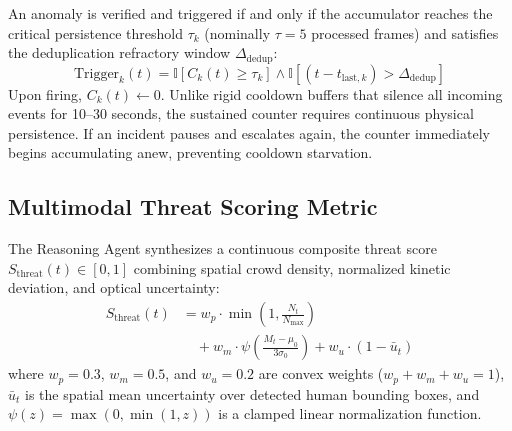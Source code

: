 \documentclass[conference]{IEEEtran}
\begin{document}
An anomaly is verified and triggered if and only if the accumulator reaches the critical persistence threshold $\tau_k$ (nominally $\tau = 5$ processed frames) and satisfies the deduplication refractory window $\Delta_{\text{dedup}}$:
\begin{equation}
\text{Trigger}_k(t) = \mathbb{I}\left[ C_k(t) \ge \tau_k \right] \land \mathbb{I}\left[ (t - t_{\text{last}, k}) > \Delta_{\text{dedup}} \right]
\end{equation}
Upon firing, $C_k(t) \leftarrow 0$. Unlike rigid cooldown buffers that silence all incoming events for 10--30 seconds, the sustained counter requires continuous physical persistence. If an incident pauses and escalates again, the counter immediately begins accumulating anew, preventing cooldown starvation.

\subsection{Multimodal Threat Scoring Metric}
The Reasoning Agent synthesizes a continuous composite threat score $S_{\text{threat}}(t) \in [0, 1]$ combining spatial crowd density, normalized kinetic deviation, and optical uncertainty:
\begin{align}
S_{\text{threat}}(t) &= w_p \cdot \min\left(1, \frac{N_t}{N_{\max}}\right) \nonumber \\
&\quad + w_m \cdot \psi\left(\frac{M_t - \mu_0}{3\sigma_0}\right) + w_u \cdot (1 - \bar{u}_t)
\end{align}
where $w_p = 0.3$, $w_m = 0.5$, and $w_u = 0.2$ are convex weights ($w_p + w_m + w_u = 1$), $\bar{u}_t$ is the spatial mean uncertainty over detected human bounding boxes, and $\psi(z) = \max(0, \min(1, z))$ is a clamped linear normalization function.
\end{document}
